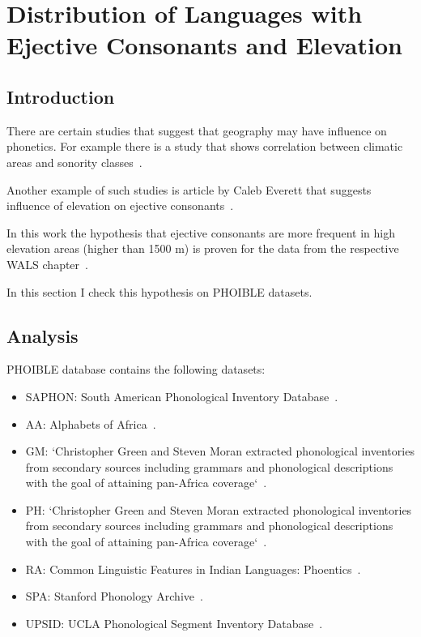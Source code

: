 \documentclass[a4paper,12pt]{article}
\begin{document}
\newpage

\section{Distribution of Languages with Ejective Consonants and Elevation}

\subsection{Introduction}

There are certain studies that suggest that geography may have influence on phonetics. For example there is a study that shows correlation between climatic areas and sonority classes~\parencite{climatesSonorants}.

Another example of such studies is article by Caleb Everett that suggests influence of elevation on ejective consonants~\parencite{ejectives}.

In this work the hypothesis that ejective consonants are more frequent in high elevation areas (higher than 1500 m) is proven for the data from the respective WALS chapter~\parencite{wals7}.

In this section I check this hypothesis on PHOIBLE datasets.

\subsection{Analysis}

PHOIBLE database contains the following datasets:
\begin{itemize}
 \item SAPHON: South American Phonological Inventory Database~\parencite{saphon}.
 \item AA: Alphabets of Africa~\parencite{aa}.
 \item GM: `Christopher Green and Steven Moran extracted phonological inventories from secondary sources including grammars and phonological descriptions with the goal of attaining pan-Africa coverage`~\parencite{gm}.
 \item PH: `Christopher Green and Steven Moran extracted phonological inventories from secondary sources including grammars and phonological descriptions with the goal of attaining pan-Africa coverage`~\parencite{gm}.
 \item RA: Common Linguistic Features in Indian Languages: Phoentics~\parencite{ra}.
 \item SPA: Stanford Phonology Archive~\parencite{spa}.
 \item UPSID: UCLA Phonological Segment Inventory Database~\parencite{upsid}.
\end{itemize}
\end{document}
